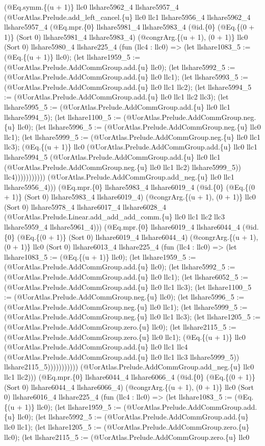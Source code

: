 \documentclass[11pt]{article}
\begin{document}
(@Eq.symm.\{(u + 1)\} llc0 llshare5962\_4 llshare5957\_4 (@UorAtlas.Prelude.add\_left\_cancel.\{u\} llc0 llc1 llshare5956\_4 llshare5962\_4 llshare5957\_4 (@Eq.mpr.\{0\} llshare5981\_4 llshare5983\_4 (@id.\{0\} (@Eq.\{(0 + 1)\} (Sort 0) llshare5981\_4 llshare5983\_4) (@congrArg.\{(u + 1), (0 + 1)\} llc0 (Sort 0) llshare5980\_4 llshare225\_4 (fun (llc4 : llc0) => (let llshare1083\_5 := (@Eq.\{(u + 1)\} llc0); (let llshare1959\_5 := (@UorAtlas.Prelude.AddCommGroup.add.\{u\} llc0); (let llshare5992\_5 := (@UorAtlas.Prelude.AddCommGroup.add.\{u\} llc0 llc1); (let llshare5993\_5 := (@UorAtlas.Prelude.AddCommGroup.add.\{u\} llc0 llc1 llc2); (let llshare5994\_5 := (@UorAtlas.Prelude.AddCommGroup.add.\{u\} llc0 llc1 llc2 llc3); (let llshare5995\_5 := (@UorAtlas.Prelude.AddCommGroup.add.\{u\} llc0 llc1 llshare5994\_5); (let llshare1100\_5 := (@UorAtlas.Prelude.AddCommGroup.neg.\{u\} llc0); (let llshare5996\_5 := (@UorAtlas.Prelude.AddCommGroup.neg.\{u\} llc0 llc1); (let llshare5999\_5 := (@UorAtlas.Prelude.AddCommGroup.neg.\{u\} llc0 llc1 llc3); (@Eq.\{(u + 1)\} llc0 (@UorAtlas.Prelude.AddCommGroup.add.\{u\} llc0 llc1 llshare5994\_5 (@UorAtlas.Prelude.AddCommGroup.add.\{u\} llc0 llc1 (@UorAtlas.Prelude.AddCommGroup.neg.\{u\} llc0 llc1 llc2) llshare5999\_5)) llc4))))))))))) (@UorAtlas.Prelude.AddCommGroup.add\_neg.\{u\} llc0 llc1 llshare5956\_4))) (@Eq.mpr.\{0\} llshare5983\_4 llshare6019\_4 (@id.\{0\} (@Eq.\{(0 + 1)\} (Sort 0) llshare5983\_4 llshare6019\_4) (@congrArg.\{(u + 1), (0 + 1)\} llc0 (Sort 0) llshare5978\_4 llshare6017\_4 llshare6028\_4 (@UorAtlas.Prelude.Linear.add\_add\_add\_comm.\{u\} llc0 llc1 llc2 llc3 llshare5959\_4 llshare5961\_4))) (@Eq.mpr.\{0\} llshare6019\_4 llshare6044\_4 (@id.\{0\} (@Eq.\{(0 + 1)\} (Sort 0) llshare6019\_4 llshare6044\_4) (@congrArg.\{(u + 1), (0 + 1)\} llc0 (Sort 0) llshare6013\_4 llshare225\_4 (fun (llc4 : llc0) => (let llshare1083\_5 := (@Eq.\{(u + 1)\} llc0); (let llshare1959\_5 := (@UorAtlas.Prelude.AddCommGroup.add.\{u\} llc0); (let llshare5992\_5 := (@UorAtlas.Prelude.AddCommGroup.add.\{u\} llc0 llc1); (let llshare6052\_5 := (@UorAtlas.Prelude.AddCommGroup.add.\{u\} llc0 llc1 llc3); (let llshare1100\_5 := (@UorAtlas.Prelude.AddCommGroup.neg.\{u\} llc0); (let llshare5996\_5 := (@UorAtlas.Prelude.AddCommGroup.neg.\{u\} llc0 llc1); (let llshare5999\_5 := (@UorAtlas.Prelude.AddCommGroup.neg.\{u\} llc0 llc1 llc3); (let llshare1205\_5 := (@UorAtlas.Prelude.AddCommGroup.zero.\{u\} llc0); (let llshare2115\_5 := (@UorAtlas.Prelude.AddCommGroup.zero.\{u\} llc0 llc1); (@Eq.\{(u + 1)\} llc0 (@UorAtlas.Prelude.AddCommGroup.add.\{u\} llc0 llc1 llc4 (@UorAtlas.Prelude.AddCommGroup.add.\{u\} llc0 llc1 llc3 llshare5999\_5)) llshare2115\_5))))))))))) (@UorAtlas.Prelude.AddCommGroup.add\_neg.\{u\} llc0 llc1 llc2))) (@Eq.mpr.\{0\} llshare6044\_4 llshare6066\_4 (@id.\{0\} (@Eq.\{(0 + 1)\} (Sort 0) llshare6044\_4 llshare6066\_4) (@congrArg.\{(u + 1), (0 + 1)\} llc0 (Sort 0) llshare6016\_4 llshare225\_4 (fun (llc4 : llc0) => (let llshare1083\_5 := (@Eq.\{(u + 1)\} llc0); (let llshare1959\_5 := (@UorAtlas.Prelude.AddCommGroup.add.\{u\} llc0); (let llshare5992\_5 := (@UorAtlas.Prelude.AddCommGroup.add.\{u\} llc0 llc1); (let llshare1205\_5 := (@UorAtlas.Prelude.AddCommGroup.zero.\{u\} llc0); (let llshare2115\_5 := (@UorAtlas.Prelude.AddCommGroup.zero.\{u\} llc0 
\end{document}
